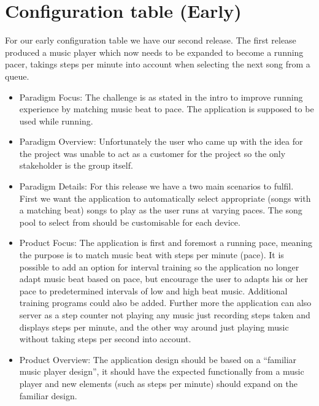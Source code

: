 \section{Configuration table (Early)}
For our early configuration table we have our second release. The first release produced a music player which now needs to be expanded to become a running pacer, takings steps per minute into account when selecting the next song from a queue.




\begin{itemize}
\item Paradigm Focus: The challenge is as stated in the intro to improve running experience by matching music beat to pace. The application is supposed to be used while running.
\item Paradigm Overview: Unfortunately the user who came up with the idea for the project was unable to act as a customer for the project so the only stakeholder is the group itself.
\item Paradigm Details: For this release we have a two main scenarios to fulfil. First we want the application to automatically select appropriate (songs with a matching beat) songs to play as the user runs at varying paces. The song pool to select from should be customisable for each device.
\item Product Focus: The application is first and foremost a running pace, meaning the purpose is to match music beat with steps per minute (pace). It is possible to add an option for interval training so the application no longer adapt music beat based on pace, but encourage the user to adapts his or her pace to predetermined intervals of low and high beat music. Additional training programs could also be added. Further more the application can also server as a step counter not playing any music just recording steps taken and displays steps per minute, and the other way around just playing music without taking steps per second into account.
\item Product Overview: The application design should be based on a ``familiar music player design'', it should have the expected functionally from a music player and new elements (such as steps per minute) should expand on the familiar design. 

\end{itemize}
